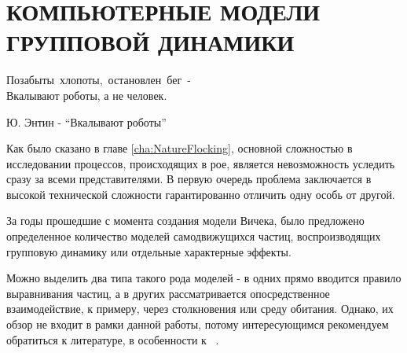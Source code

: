 \chapter{КОМПЬЮТЕРНЫЕ МОДЕЛИ ГРУППОВОЙ ДИНАМИКИ}
\label{ch:ComputerModelsOfHords}

\epigraph{Позабыты~хлопоты,~остановлен~бег~- \\
Вкалывают роботы, а не человек.}{Ю. Энтин - ``Вкалывают роботы''}
Как было сказано в главе \ref{cha:NatureFlocking}, основной сложностью в исследовании процессов, происходящих в рое, является невозможность уследить сразу за всеми представителями. В первую очередь проблема заключается в высокой технической сложности гарантированно отличить одну особь от другой.



За годы прошедшие с момента создания модели Вичека, было предложено определенное количество моделей самодвижущихся частиц, воспроизводящих групповую динамику или отдельные характерные эффекты.

Можно выделить два типа такого рода моделей - в одних прямо вводится правило выравнивания частиц, а в других рассматривается опосредственное взаимодействие, к примеру, через столкновения или среду обитания. Однако, их обзор не входит в рамки данной работы, потому интересующимся рекомендуем обратиться к литературе, в особенности к ~\cite{vicsek2012}.